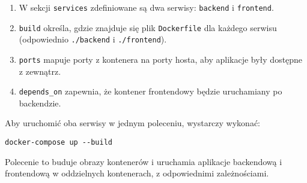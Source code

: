 \begin{enumerate}
    \item W sekcji \texttt{services} zdefiniowane są dwa serwisy: \texttt{backend} i \texttt{frontend}.
    \item \texttt{build} określa, gdzie znajduje się plik \texttt{Dockerfile} dla każdego serwisu (odpowiednio \texttt{./backend} i \texttt{./frontend}).
    \item \texttt{ports} mapuje porty z kontenera na porty hosta, aby aplikacje były dostępne z zewnątrz.
    \item \texttt{depends\_on} zapewnia, że kontener frontendowy będzie uruchamiany po backendzie.
\end{enumerate}

Aby uruchomić oba serwisy w jednym poleceniu, wystarczy wykonać:
\begin{lstlisting}
docker-compose up --build
\end{lstlisting}

Polecenie to buduje obrazy kontenerów i uruchamia aplikacje backendową i frontendową w oddzielnych kontenerach, z odpowiednimi zależnościami.










